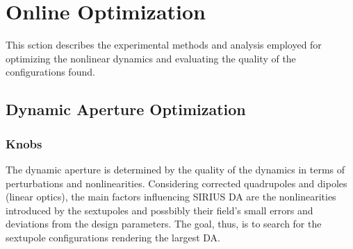 \section{Online Optimization}
This sction describes the experimental methods and analysis employed for optimizing the nonlinear dynamics and evaluating the quality of the configurations found.
\subsection{Dynamic Aperture Optimization}
\subsubsection{Knobs}
The dynamic aperture is determined by the quality of the dynamics in terms of perturbations and nonlinearities. Considering corrected quadrupoles and dipoles (linear optics), the main factors influencing SIRIUS DA are the nonlinearities introduced by the sextupoles and possbibly their field's small errors and deviations from the design parameters. The goal, thus, is to search for the sextupole configurations rendering the largest DA.


